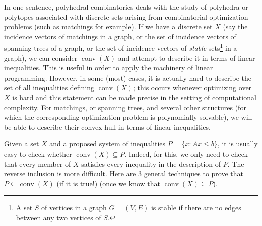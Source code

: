 \documentclass[12pt]{article}
\newcommand{\conv}{\operatorname{conv}}
\begin{document}
In one sentence, polyhedral combinatorics deals with the study of
polyhedra or polytopes associated with discrete sets arising from
combinatorial optimization problems (such as matchings for example).
If we have a discrete set $X$ (say the incidence vectors of matchings
in a graph, or the set of incidence vectors of spanning trees of a
graph, or the set of incidence vectors of {\it stable} sets\footnote{A
set $S$ of vertices in a graph $G=(V,E)$ is stable if there are no
edges between any two vertices of $S$.} in a graph), we can consider
$\conv(X)$ and attempt to describe it in terms of linear
inequalities. This is useful in order to apply the machinery of linear
programming. However, in some (most) cases, it is actually hard to
describe the set of all inequalities defining $\conv(X)$; this occurs
whenever optimizing over $X$ is hard and this statement can be made
precise in the setting of computational complexity. For matchings, or
spanning trees, and several other structures (for which the
corresponding optimization problem is polynomially solvable), we will
be able to describe their convex hull in terms of linear inequalities.

Given a set $X$ and a proposed system of inequalities $P=\{x: Ax \leq
b\}$, it is usually easy to check whether $\conv(X) \subseteq
P$. Indeed, for this, we only need to check that every member of $X$
satisfies every  inequality in the description of
$P$. The reverse inclusion is more difficult. Here are 3 general
techniques to prove that $P \subseteq \conv(X)$ (if it is true!) (once
we know that $\conv(X) \subseteq P$).
\end{document}
